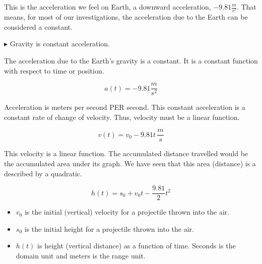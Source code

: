 \documentclass{ximera}
\begin{document}
This is the acceleration we feel on Earth, a downward acceleration, $-9.81 \frac{m}{s^2}$.   That means, for most of our investigations, the acceleration due to the Earth can be considered a constant.




$\blacktriangleright$ Gravity is constant acceleration.

The acceleration due to the Earth's gravity is a constant.  It is a constant function with respect to time or position.


\[ a(t) = -9.81 \frac{m}{s^2}  \]



Acceleration is meters per second PER second.  This constant acceleration is a constant rate of change of velocity.  Thus, velocity must be a linear function.




\[ v(t) = v_0 - 9.81 t  \, \frac{m}{s}\]



This velocity is a linear function. The accumulated distance travelled would be the accumulated area under its graph. We have seen that this area (distance) is a described by a quadratic. 




\[ h(t) = s_0 + v_0 t - \frac{9.81}{2} t^2  \]




\begin{itemize}
\item $v_0$ is the initial (vertical) velocity for a projectile thrown into the air. \\

\item $s_0$ is the initial height for a projectile thrown into the air. \\

\item $h(t)$ is height (vertical distance) as a function of time.  Seconds is the domain unit and meters is the range unit.
\end{itemize}
\end{document}
